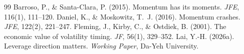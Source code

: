 \documentclass[12pt,a4paper]{article}
\begin{document}

\begin{thebibliography}{99}
Barroso, P., \& Santa-Clara, P. (2015). Momentum has its moments. \textit{JFE}, 116(1), 111--120.
Daniel, K., \& Moskowitz, T.~J. (2016). Momentum crashes. \textit{JFE}, 122(2), 221--247.
Fleming, J., Kirby, C., \& Ostdiek, B. (2001). The economic value of volatility timing. \textit{JF}, 56(1), 329--352.
Lai, Y.-H. (2026a). Leverage direction matters. \textit{Working Paper}, Da-Yeh University.
\end{thebibliography}
\end{document}

